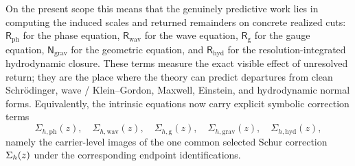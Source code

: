 On the present scope this means that the genuinely predictive work lies in
computing the induced scales and returned remainders on concrete realized cuts:
\(\mathsf R_{\mathrm{ph}}\) for the phase equation,
\(\mathsf R_{\mathrm{wav}}\) for the wave equation,
\(\mathsf R_{\mathrm g}\) for the gauge equation,
\(\mathsf N_{\mathrm{grav}}\) for the geometric equation, and
\(\mathsf R_{\mathrm{hyd}}\) for the resolution-integrated hydrodynamic closure.
These terms measure the exact visible effect of unresolved return; they are the
place where the theory can predict departures from clean Schr\"odinger, wave /
Klein--Gordon, Maxwell, Einstein, and hydrodynamic normal forms.
Equivalently, the intrinsic equations now carry explicit symbolic correction terms
\[
\Sigma_{h,\mathrm{ph}}(z),\quad
\Sigma_{h,\mathrm{wav}}(z),\quad
\Sigma_{h,\mathrm g}(z),\quad
\Sigma_{h,\mathrm{grav}}(z),\quad
\Sigma_{h,\mathrm{hyd}}(z),
\]
namely the carrier-level images of the one common selected Schur correction
\(\Sigma_{h}(z)\) under the corresponding endpoint identifications.

